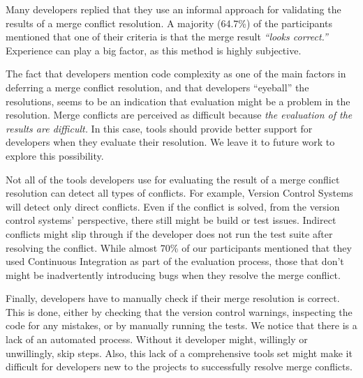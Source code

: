 Many developers replied that they use an informal approach for validating the results of a merge conflict resolution.
A majority (64.7\%) of the participants mentioned that one of their criteria is that the merge result \emph{``looks correct.''}
Experience can play a big factor, as this method is highly subjective.

The fact that developers mention code complexity as one of the main factors in deferring a merge conflict resolution, and that developers ``eyeball'' the resolutions, seems to be an indication that evaluation might be a problem in the resolution.
Merge conflicts are perceived as difficult because \emph{the evaluation of the results are difficult.}
In this case, tools should provide better support for developers when they evaluate their resolution.
We leave it to future work to explore this possibility.

Not all of the tools developers use for evaluating the result of a merge conflict resolution can detect all types of conflicts.
For example, Version Control Systems will detect only direct conflicts.
Even if the conflict is solved, from the version control systems' perspective, there still might be build or test issues.
Indirect conflicts might slip through if the developer does not run the test suite after resolving the conflict.
While almost 70\% of our participants mentioned that they used Continuous Integration as part of the evaluation process, those that don't might be inadvertently introducing bugs when they resolve the merge conflict.

Finally, developers have to manually check if their merge resolution is correct.
This is done, either by checking that the version control warnings, inspecting the code for any mistakes, or by manually running the tests.
We notice that there is a lack of an automated process.
Without it developer might, willingly or unwillingly, skip steps.
Also, this lack of a comprehensive tools set might make it difficult for developers new to the projects to successfully resolve merge conflicts.

